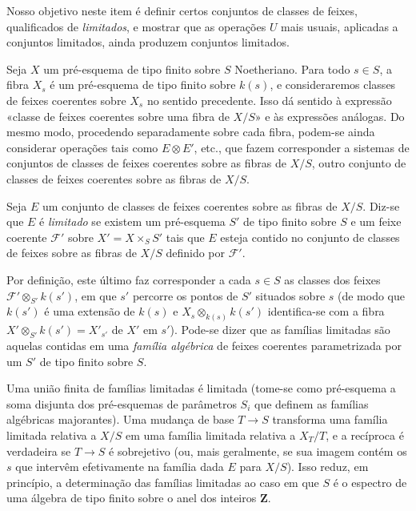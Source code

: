 Nosso objetivo neste item é definir certos conjuntos de classes de feixes,
qualificados de \emph{limitados}, e mostrar que as operações $U$ mais usuais,
aplicadas a conjuntos limitados, ainda produzem conjuntos limitados.

Seja $X$ um pré-esquema de tipo finito sobre $S$ Noetheriano. Para todo
$s\in S$, a fibra $X_s$ é um pré-esquema de tipo finito sobre $k(s)$, e
consideraremos classes de feixes coerentes sobre $X_s$ no sentido precedente.
Isso dá sentido à expressão «classe de feixes coerentes sobre uma fibra de
$X/S$» e às expressões análogas. Do mesmo modo, procedendo separadamente sobre
cada fibra, podem-se ainda considerar operações tais como $E\otimes E'$, etc.,
que fazem corresponder a sistemas de conjuntos de
classes de feixes coerentes sobre as fibras de $X/S$, outro conjunto de classes
de feixes coerentes sobre as fibras de $X/S$.

 Seja $E$ um conjunto de classes de feixes coerentes
sobre as fibras de $X/S$. Diz-se que $E$ é \emph{limitado} se existem um
pré-esquema $S'$ de tipo finito sobre $S$ e um feixe coerente $\mathcal F'$ sobre
$X'=X\times_S S'$ tais que $E$ esteja contido no conjunto de classes de feixes
sobre as fibras de $X/S$ definido por $\mathcal F'$.

Por definição, este último faz corresponder a cada $s\in S$ as classes dos
feixes $\mathcal F'\otimes_{S'}k(s')$, em que $s'$ percorre os pontos de $S'$
situados sobre $s$ (de modo que $k(s')$ é uma extensão de $k(s)$ e
$X_s\otimes_{k(s)}k(s')$ identifica-se com a fibra
$X'\otimes_{S'}k(s')=X'_{s'}$ de $X'$ em $s'$). Pode-se dizer que as famílias
limitadas são aquelas contidas em uma \emph{família algébrica} de feixes
coerentes parametrizada por um $S'$ de tipo finito sobre $S$.

Uma união finita de famílias limitadas é limitada (tome-se como pré-esquema a
soma disjunta dos pré-esquemas de parâmetros $S_i$ que definem as famílias
algébricas majorantes). Uma mudança de base $T\longrightarrow S$ transforma uma
família limitada relativa a $X/S$ em uma família limitada relativa a $X_T/T$, e
a recíproca é verdadeira se $T\longrightarrow S$ é sobrejetivo (ou, mais
geralmente, se sua imagem contém os $s$ que intervêm efetivamente na família
dada $E$ para $X/S$). Isso reduz, em princípio, a determinação das famílias
limitadas ao caso em que $S$ é o espectro de uma álgebra de tipo finito sobre o
anel dos inteiros $\mathbf Z$.

